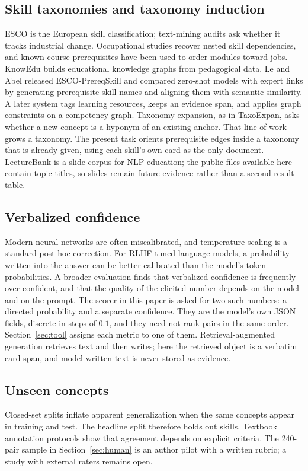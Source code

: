 \documentclass{ws-ijait}
\begin{document}
\subsection{Skill taxonomies and taxonomy induction}
{ESCO} is the European skill classification; text-mining audits ask
whether it tracks industrial change\cite{Chiarello_2021}.
Occupational studies recover nested skill
dependencies\cite{Hosseinioun_2025}, and known course prerequisites
have been used to order modules toward jobs\cite{Dai_2021}.
{KnowEdu}\cite{Chen_2018} builds educational knowledge graphs from
pedagogical data.
Le and Abel\cite{Le_2025} released {ESCO-PrereqSkill} and compared
zero-shot models with expert links by generating prerequisite skill
names and aligning them with semantic similarity.
A later system tags learning resources, keeps an evidence span, and
applies graph constraints on a competency graph\cite{Le_LBG_2026}.
Taxonomy expansion, as in TaxoExpan\cite{Shen_2020}, asks whether a
new concept is a hyponym of an existing anchor.
That line of work grows a taxonomy.
The present task orients prerequisite edges inside a taxonomy that
is already given, using each skill's own card as the only document.
LectureBank\cite{Li_2019} is a slide corpus for {NLP} education; the
public files available here contain topic titles, so slides remain
future evidence rather than a second result table.

\subsection{Verbalized confidence}
Modern neural networks are often miscalibrated, and temperature
scaling is a standard post-hoc correction\cite{Guo_2017}.
For {RLHF}-tuned language models, a probability written into the
answer can be better calibrated than the model's token
probabilities\cite{Tian_2023}.
A broader evaluation finds that verbalized confidence is frequently
over-confident, and that the quality of the elicited number depends
on the model and on the prompt\cite{Xiong_2024}.
The scorer in this paper is asked for two such numbers: a directed
probability and a separate confidence.
They are the model's own {JSON} fields, discrete in steps of
$0.1$, and they need not rank pairs in the same order.
Section~\ref{sec:tool} assigns each metric to one of them.
Retrieval-augmented generation retrieves text and then
writes\cite{Lewis_2020}; here the retrieved object is a verbatim
card span, and model-written text is never stored as evidence.

\subsection{Unseen concepts}
Closed-set splits inflate apparent generalization when the same
concepts appear in training and test\cite{Zhu_2022}.
The headline split therefore holds out skills.
Textbook annotation protocols show that agreement depends on
explicit criteria\cite{Alzetta_2024}.
The 240-pair sample in Section~\ref{sec:human} is an author pilot
with a written rubric; a study with external raters remains open.
\end{document}
